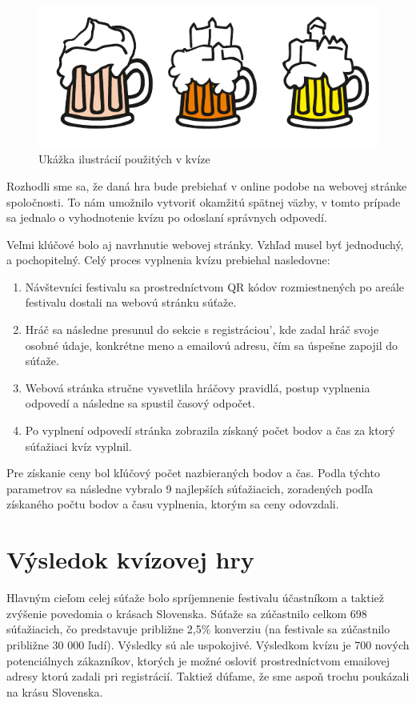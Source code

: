 \documentclass[10pt,twoside,slovak,a4paper]{article}
\begin{document}
\begin{figure}[h]
	\centering
	\includegraphics[scale=1.0]{obrazok1.pdf}

\caption{Ukážka ilustrácií použitých v kvíze}

\end{figure}


Rozhodli sme sa, že daná hra bude prebiehať v online podobe na webovej stránke spoločnosti. To nám umožnilo vytvoriť okamžitú spätnej väzby, v tomto prípade sa jednalo o vyhodnotenie kvízu po odoslaní správnych odpovedí. 

Veľmi klúčové bolo aj navrhnutie webovej stránky. Vzhľad musel byť jednoduchý, a pochopitelný. Celý proces vyplnenia kvízu prebiehal nasledovne:




\begin{enumerate}
	\item Návštevníci festivalu sa prostredníctvom QR kódov rozmiestnených po areále festivalu dostali na webovú stránku súťaže.
	\item Hráč sa následne presunul do sekcie s registráciou', kde zadal hráč svoje osobné údaje, konkrétne meno a emailovú adresu, čím sa úspešne zapojil do súťaže.
	\item Webová stránka stručne vysvetlila hráčovy pravidlá, postup vyplnenia odpovedí a následne sa spustil časový odpočet.
	\item Po vyplnení odpovedí stránka zobrazila získaný počet bodov a čas za ktorý súťažiaci kvíz vyplnil.
\end{enumerate}




Pre získanie ceny bol kľúčový počet nazbieraných bodov a čas. Podla týchto parametrov sa následne vybralo 9 najlepších súťažiacich, zoradených podľa získaného počtu bodov a času vyplnenia, ktorým sa ceny odovzdali.
\clearpage
\section{Výsledok kvízovej hry}

Hlavným cieľom celej súťaže bolo spríjemnenie festivalu účastníkom a taktiež zvýšenie povedomia o krásach Slovenska. Súťaže sa zúčastnilo celkom 698 súťažiacich, čo predstavuje približne 2,5\% konverziu (na festivale sa zúčastnilo približne 30 000 ľudí). Výsledky sú ale uspokojivé. Výsledkom kvízu je 700 nových potenciálnych zákazníkov, ktorých je možné osloviť prostredníctvom emailovej adresy ktorú zadali pri registrácií. Taktiež dúfame, že sme aspoň trochu poukázali na krásu Slovenska.


 
\end{document}
